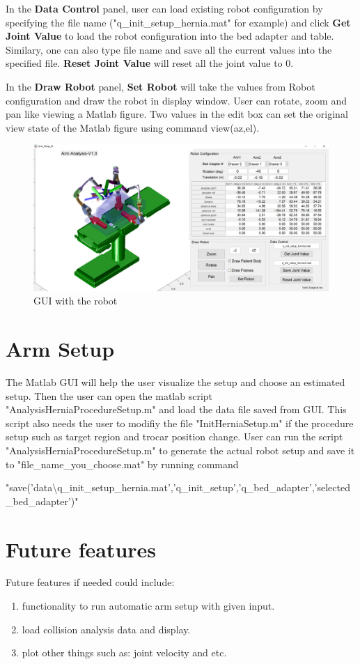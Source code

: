 \documentclass{article}
\begin{document}
In the \textbf{Data Control} panel, user can load existing robot configuration by specifying the file name ("q\_init\_setup\_hernia.mat" for example) and click \textbf{Get Joint Value} to load the robot configuration into the bed adapter and table. Similary, one can also type file name and save all the current values into the specified file. \textbf{Reset Joint Value} will reset all the joint value to 0.

In the  \textbf{Draw Robot} panel, \textbf{Set Robot} will take the values from Robot configuration and draw the robot in display window. User can rotate, zoom and pan like viewing a Matlab figure. Two values in the edit box can set the original view state of the Matlab figure using command view(az,el).

\begin{figure}[htbp]
  \centering
    \includegraphics[width=1\columnwidth]{GUI_robot}
	\caption{GUI with the robot}\label{fig:GUI_robot}
\end{figure}
\section{Arm Setup}
The Matlab GUI will help the user visualize the setup and choose an estimated setup. Then the user can open the matlab script "AnalysisHerniaProcedureSetup.m" and load the data file saved from GUI. This script also needs the user to modifiy the file "InitHerniaSetup.m" if the procedure setup such as target region and trocar position change. User can run the script "AnalysisHerniaProcedureSetup.m" to generate the actual robot setup and save it to "file\_name\_you\_choose.mat" by running command

"save('data\textbackslash q\_init\_setup\_hernia.mat','q\_init\_setup','q\_bed\_adapter','selected\_bed\_adapter')"
\section{Future features}
Future features if needed could include:
\begin{enumerate}
\item functionality to run automatic arm setup with given input.
\item load collision analysis data and display.
\item plot other things such as: joint velocity and etc.
\end{enumerate}
\end{document}

